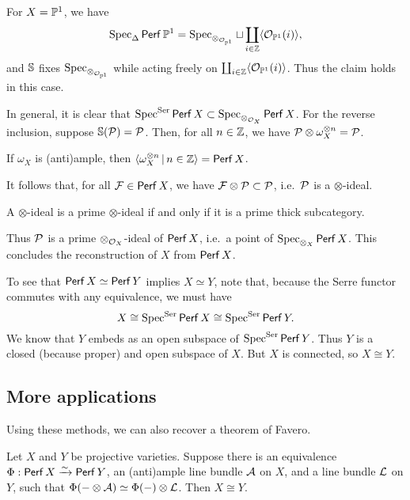 \documentclass{amsart}
\begin{document}
\begin{ex}
	For $X = \mathbb{P}^1$, we have
	\[
		\operatorname{Spec}_\Delta \mathsf{Perf}\, \mathbb{P}^1 = \operatorname{Spec}_{\otimes_{\mathcal{O}_{\mathbb{P}^1}}} \sqcup \coprod_{i \in \mathbb{Z}} \langle {\mathcal{O}_{\mathbb{P}^1}(i)} \rangle,
	\]
	and $\mathbb{S}$ fixes $\operatorname{Spec}_{\otimes_{\mathcal{O}_{\mathbb{P}^1}}}$ while acting freely on $\coprod_{i \in \mathbb{Z}} \langle {\mathcal{O}_{\mathbb{P}^1}(i)} \rangle$.
	Thus the claim holds in this case.
\end{ex}

In general, it is clear that $\operatorname{Spec}^{\mathrm{Ser}} \mathsf{Perf}\, X \subset \operatorname{Spec}_{\otimes_{\mathcal{O}_X}} \mathsf{Perf}\, X$.
For the reverse inclusion, suppose $\mathbb{S}(\mathcal{P}) = \mathcal{P}$.
Then, for all $n \in \mathbb{Z}$, we have $\mathcal{P} \otimes \omega_X^{\otimes n} = \mathcal{P}$.

\begin{thm}[Orlov]
	If $\omega_X$ is (anti)ample, then $\langle \omega_X^{\otimes n} \,|\, n \in \mathbb{Z}\rangle = \mathsf{Perf}\, X$.
\end{thm}

It follows that, for all $\mathcal{F} \in \mathsf{Perf}\, X$, we have $\mathcal{F} \otimes \mathcal{P} \subset \mathcal{P}$, i.e.\ $\mathcal{P}$ is a $\otimes$-ideal.

\begin{thm}[Matsui]
	A $\otimes$-ideal is a prime $\otimes$-ideal if and only if it is a prime thick subcategory.
\end{thm}

Thus $\mathcal{P}$ is a prime $\otimes_{\mathcal{O}_X}$-ideal of $\mathsf{Perf}\, X$, i.e.\ a point of $\operatorname{Spec}_{\otimes_X} \mathsf{Perf}\, X$.
This concludes the reconstruction of $X$ from $\mathsf{Perf}\, X$.

To see that $\mathsf{Perf}\, X \simeq \mathsf{Perf}\, Y$ implies $X \simeq Y$, note that, because the Serre functor commutes with any equivalence, we must have 
\[
	X \cong \operatorname{Spec}^{\mathrm{Ser}} \mathsf{Perf}\, X \cong \operatorname{Spec}^{\mathrm{Ser}} \mathsf{Perf}\, Y.
\]
We know that $Y$ embeds as an open subspace of $\operatorname{Spec}^{\mathrm{Ser}} \mathsf{Perf}\, Y$.
Thus $Y$ is a closed (because proper) and open subspace of $X$.
But $X$ is connected, so $X \cong Y$.

\subsection{More applications}

Using these methods, we can also recover a theorem of Favero.

\begin{thm}[Favero]
	Let $X$ and $Y$ be projective varieties.
	Suppose there is an equivalence $\Phi: \mathsf{Perf}\, X \xrightarrow{\sim} \mathsf{Perf}\, Y$, an (anti)ample line bundle $\mathcal{A}$ on $X$, and a line bundle $\mathcal{L}$ on $Y$, such that $\Phi(- \otimes \mathcal{A}) \simeq \Phi(-) \otimes \mathcal{L}$.
	Then $X \cong Y$.
\end{thm}
\end{document}
